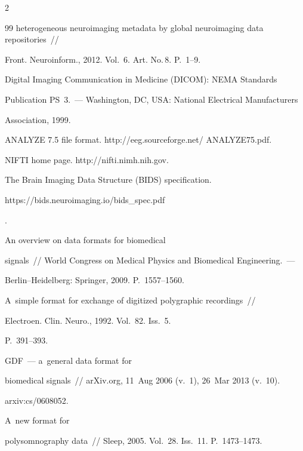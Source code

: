 \begin{multicols}{2}
{{\begin{thebibliography}{99}
heterogeneous neuroimaging metadata by global neuroimaging data repositories~// 


Front. Neuroinform., 2012. Vol.~6. Art. No.\,8. P.~1--9.




  Digital Imaging Communication in Medicine (DICOM): NEMA Standards 


Publication PS~3.~--- Washington, DC, USA: National Electrical Manufacturers 


Association, 1999.




  ANALYZE 7.5 file format. {\sf http://eeg.sourceforge.net/ ANALYZE75.pdf}.




  NIFTI home page. {\sf http://nifti.nimh.nih.gov}.




  The Brain Imaging Data Structure (BIDS) specification. {\sf 


https://bids.neuroimaging.io/bids\_spec.pdf}.




   An overview on data formats for biomedical 


signals~// World Congress on Medical Physics and Biomedical Engineering.~--- 


Berlin--Heidelberg: Springer, 2009. P.~1557--1560.




   A~simple format for exchange of digitized polygraphic recordings~// 


Electroen. Clin. Neuro., 1992. Vol.~82. Iss.~5. 


P.~391--393.




   GDF~--- a~general data format for 


biomedical signals~// arXiv.org, 11~Aug 2006 (v.~1), 26~Mar 2013 (v.~10). 


arxiv:cs/0608052.




   A~new format for 


polysomnography data~// Sleep, 2005. Vol.~28. Iss.~11. P.~1473--1473.



\end{thebibliography}}}
\end{multicols}
